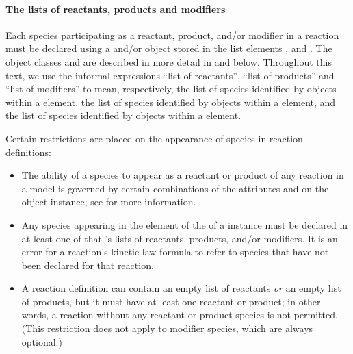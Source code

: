 

\paragraph{The lists of reactants, products and modifiers}

Each species participating as a reactant, product, and/or modifier
in a reaction must be declared using a \SpeciesReference and/or
\ModifierSpeciesReference object stored in the list elements
,  and
.  The object classes \SpeciesReference and
\ModifierSpeciesReference are described in more detail in
and  below.  Throughout this text,
we use the informal expressions ``list of reactants'', ``list of
products'' and ``list of modifiers'' to mean, respectively, the
list of species identified by \SpeciesReference objects within a
\Reaction {} element, the list of species
identified by \SpeciesReference objects within a \Reaction
{} element, and the list of species identified
by \ModifierSpeciesReference objects within a \Reaction
{} element.

Certain restrictions are placed on the appearance of species in
reaction definitions:
\begin{itemize}
  
\item The ability of a species to appear as a reactant or product
  of any reaction in a model is governed by certain combinations
  of the attributes  and 
  on the \Species object instance; see
   for more information.
  
\item Any species appearing in the  element of the
   of a \Reaction instance must be declared in
  at least one of that \Reaction's lists of reactants, products,
  and/or modifiers.  It is an error for a reaction's kinetic law
  formula to refer to species that have not been declared for that
  reaction.
  
\item A reaction definition can contain an empty list of reactants
  \emph{or} an empty list of products, but it must have at least
  one reactant or product; in other words, a reaction without any
  reactant or product species is not permitted.  (This restriction
  does not apply to modifier species, which are always optional.)

\end{itemize}


